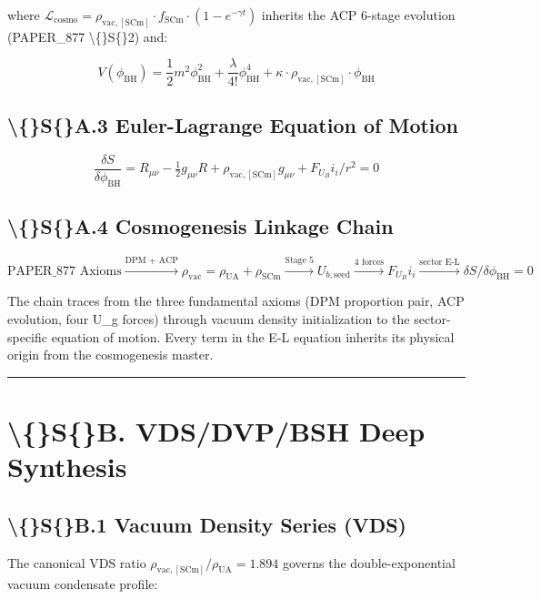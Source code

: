 \documentclass[11pt]{article}
\begin{document}
where $\mathcal{L}_{\mathrm{cosmo}} = \rho_{\mathrm{vac,[SCm]}} \cdot f_{\mathrm{SCm}} \cdot (1 - e^{-\gamma t})$ inherits the ACP 6-stage evolution (PAPER\_877 \textbackslash\{\}S\{\}2) and:

$$V(\phi_{\mathrm{BH}}) = \frac{1}{2} m^2 \phi_{\mathrm{BH}}^2 + \frac{\lambda}{4!} \phi_{\mathrm{BH}}^4 + \kappa \cdot \rho_{\mathrm{vac,[SCm]}} \cdot \phi_{\mathrm{BH}}$$

\subsection*{\textbackslash\{\}S\{\}A.3 Euler-Lagrange Equation of Motion}

$$\boxed{\frac{\delta S}{\delta \phi_{\mathrm{BH}}} = R_{\mu\nu} - \tfrac{1}{2}g_{\mu\nu}R + \rho_{\mathrm{vac,[SCm]}} g_{\mu\nu} + F_U_Bi_i/r^2 = 0}$$

\subsection*{\textbackslash\{\}S\{\}A.4 Cosmogenesis Linkage Chain}

$$\text{PAPER\_877 Axioms} \xrightarrow{\text{DPM + ACP}} \rho_{\mathrm{vac}} = \rho_{\mathrm{UA}} + \rho_{\mathrm{SCm}} \xrightarrow{\text{Stage 5}} U_{b,\mathrm{seed}} \xrightarrow{\text{4 forces}} F_U_Bi_i \xrightarrow{\text{sector E-L}} \delta S/\delta \phi_{\mathrm{BH}} = 0$$

The chain traces from the three fundamental axioms (DPM proportion pair, ACP evolution, four U\_g forces) through vacuum density initialization to the sector-specific equation of motion. Every term in the E-L equation inherits its physical origin from the cosmogenesis master.

\noindent\rule{\textwidth}{0.4pt}

\section*{\textbackslash\{\}S\{\}B. VDS/DVP/BSH Deep Synthesis}

\subsection*{\textbackslash\{\}S\{\}B.1 Vacuum Density Series (VDS)}

The canonical VDS ratio $\rho_{\mathrm{vac,[SCm]}} / \rho_{\mathrm{UA}} = 1.894$ governs the double-exponential vacuum condensate profile:
\end{document}
